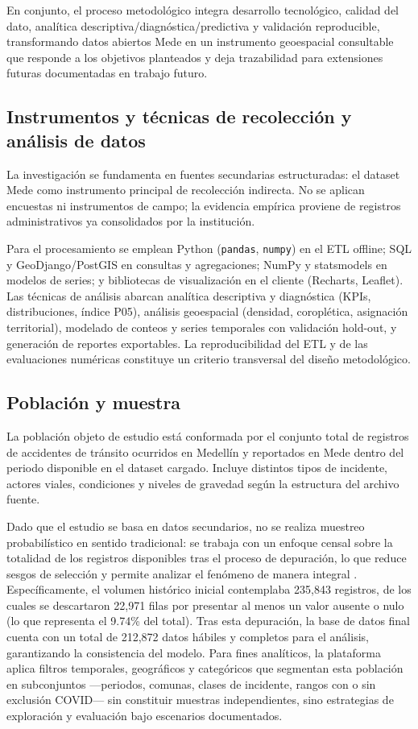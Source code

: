 En conjunto, el proceso metodológico integra desarrollo tecnológico, calidad del dato, analítica descriptiva/diagnóstica/predictiva y validación reproducible, transformando datos abiertos Mede en un instrumento geoespacial consultable que responde a los objetivos planteados y deja trazabilidad para extensiones futuras documentadas en trabajo futuro.

\clearpage

\subsection{Instrumentos y técnicas de recolección y análisis de datos}

La investigación se fundamenta en fuentes secundarias estructuradas: el dataset Mede como instrumento principal de recolección indirecta. No se aplican encuestas ni instrumentos de campo; la evidencia empírica proviene de registros administrativos ya consolidados por la institución.

Para el procesamiento se emplean Python (\texttt{pandas}, \texttt{numpy}) en el ETL offline; SQL y GeoDjango/PostGIS en consultas y agregaciones; NumPy y statsmodels en modelos de series; y bibliotecas de visualización en el cliente (Recharts, Leaflet). Las técnicas de análisis abarcan analítica descriptiva y diagnóstica (KPIs, distribuciones, índice P05), análisis geoespacial (densidad, coroplética, asignación territorial), modelado de conteos y series temporales con validación hold-out, y generación de reportes exportables. La reproducibilidad del ETL y de las evaluaciones numéricas constituye un criterio transversal del diseño metodológico.

\subsection{Población y muestra}

La población objeto de estudio está conformada por el conjunto total de registros de accidentes de tránsito ocurridos en Medellín y reportados en Mede dentro del periodo disponible en el dataset cargado. Incluye distintos tipos de incidente, actores viales, condiciones y niveles de gravedad según la estructura del archivo fuente.

Dado que el estudio se basa en datos secundarios, no se realiza muestreo probabilístico en sentido tradicional: se trabaja con un enfoque censal sobre la totalidad de los registros disponibles tras el proceso de depuración, lo que reduce sesgos de selección y permite analizar el fenómeno de manera integral \cite{oviedo2025}. Específicamente, el volumen histórico inicial contemplaba 235,843 registros, de los cuales se descartaron 22,971 filas por presentar al menos un valor ausente o nulo (lo que representa el 9.74\% del total). Tras esta depuración, la base de datos final cuenta con un total de 212,872 datos hábiles y completos para el análisis, garantizando la consistencia del modelo. Para fines analíticos, la plataforma aplica filtros temporales, geográficos y categóricos que segmentan esta población en subconjuntos ---periodos, comunas, clases de incidente, rangos con o sin exclusión COVID--- sin constituir muestras independientes, sino estrategias de exploración y evaluación bajo escenarios documentados.
